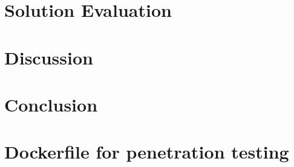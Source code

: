 \documentclass[english, 12pt, a4paper, sci, utf8, a-2b, online]{aaltothesis}
\begin{document}
\clearpage

\section{Solution Evaluation} \label{sec:solution}

\clearpage

\section{Discussion} \label{sec:discussion}

\clearpage

\section{Conclusion} \label{sec:conclusion}

\clearpage

\thesisbibliography
\printbibliography

\clearpage

\thesisappendix

\section{Dockerfile for penetration testing} \label{app:malicious-sidecar}
\end{document}

